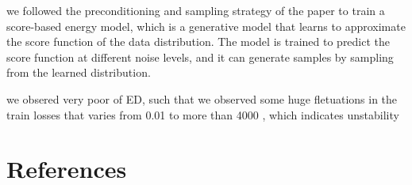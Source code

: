 \documentclass[twocolumn,superscriptaddress,aps]{revtex4-1}
\begin{document}
we followed the preconditioning and sampling strategy of the paper \cite{karras2022elucidating} to train a score-based energy model, which is a generative model that learns to approximate the score function of the data distribution. The model is trained to predict the score function at different noise levels, and it can generate samples by sampling from the learned distribution.

we obsered very poor of ED, such that we observed some huge fletuations in the train losses that varies from 0.01 to more than 4000 , which indicates unstability 



\newpage
\section{References}



\end{document}
